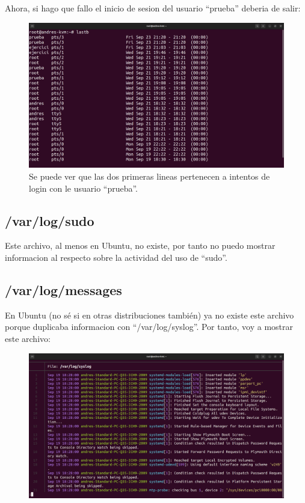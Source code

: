 \documentclass{article}
\begin{document}
Ahora, si hago que fallo el inicio de sesion del usuario ``prueba'' deberia de salir:

\begin{figure}[H]
    \includegraphics[width=\textwidth]{imagenes/lastbpruebafirst.png}
    \caption{Se puede ver que las dos primeras lineas pertenecen a intentos de login con le usuario ``prueba''.}
\end{figure}

\subsection{/var/log/sudo}
Este archivo, al menos en Ubuntu, no existe, por tanto no puedo mostrar informacion al respecto sobre la actividad del uso de ``sudo''.
\subsection{/var/log/messages}
En Ubuntu (no sé si en otras distribuciones también) ya no existe este archivo porque duplicaba informacion con ``/var/log/syslog''. Por tanto, voy a mostrar este archivo:

\begin{figure}[H]
    \includegraphics[width=\textwidth]{imagenes/syslog.png}
\end{figure}
\end{document}
